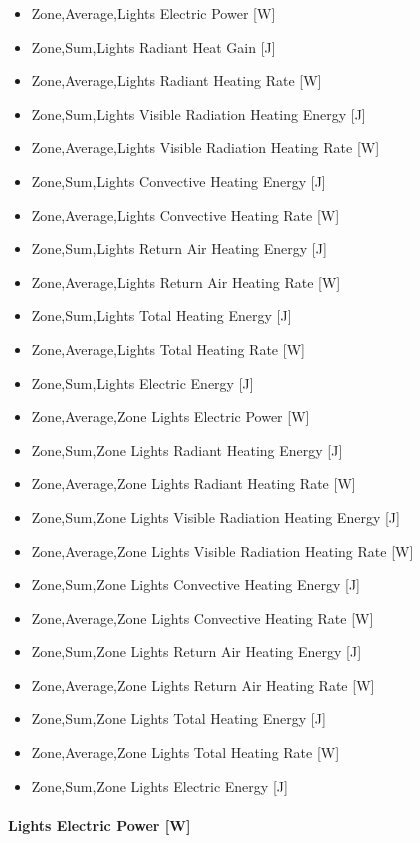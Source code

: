 \begin{itemize}
\item
  Zone,Average,Lights Electric Power {[}W{]}
\item
  Zone,Sum,Lights Radiant Heat Gain {[}J{]}
\item
  Zone,Average,Lights Radiant Heating Rate {[}W{]}
\item
  Zone,Sum,Lights Visible Radiation Heating Energy {[}J{]}
\item
  Zone,Average,Lights Visible Radiation Heating Rate {[}W{]}
\item
  Zone,Sum,Lights Convective Heating Energy {[}J{]}
\item
  Zone,Average,Lights Convective Heating Rate {[}W{]}
\item
  Zone,Sum,Lights Return Air Heating Energy {[}J{]}
\item
  Zone,Average,Lights Return Air Heating Rate {[}W{]}
\item
  Zone,Sum,Lights Total Heating Energy {[}J{]}
\item
  Zone,Average,Lights Total Heating Rate {[}W{]}
\item
  Zone,Sum,Lights Electric Energy {[}J{]}
\item
  Zone,Average,Zone Lights Electric Power {[}W{]}
\item
  Zone,Sum,Zone Lights Radiant Heating Energy {[}J{]}
\item
  Zone,Average,Zone Lights Radiant Heating Rate {[}W{]}
\item
  Zone,Sum,Zone Lights Visible Radiation Heating Energy {[}J{]}
\item
  Zone,Average,Zone Lights Visible Radiation Heating Rate {[}W{]}
\item
  Zone,Sum,Zone Lights Convective Heating Energy {[}J{]}
\item
  Zone,Average,Zone Lights Convective Heating Rate {[}W{]}
\item
  Zone,Sum,Zone Lights Return Air Heating Energy {[}J{]}
\item
  Zone,Average,Zone Lights Return Air Heating Rate {[}W{]}
\item
  Zone,Sum,Zone Lights Total Heating Energy {[}J{]}
\item
  Zone,Average,Zone Lights Total Heating Rate {[}W{]}
\item
  Zone,Sum,Zone Lights Electric Energy {[}J{]}
\end{itemize}

\paragraph{Lights Electric Power {[}W{]}}\label{lights-electric-power-w}

